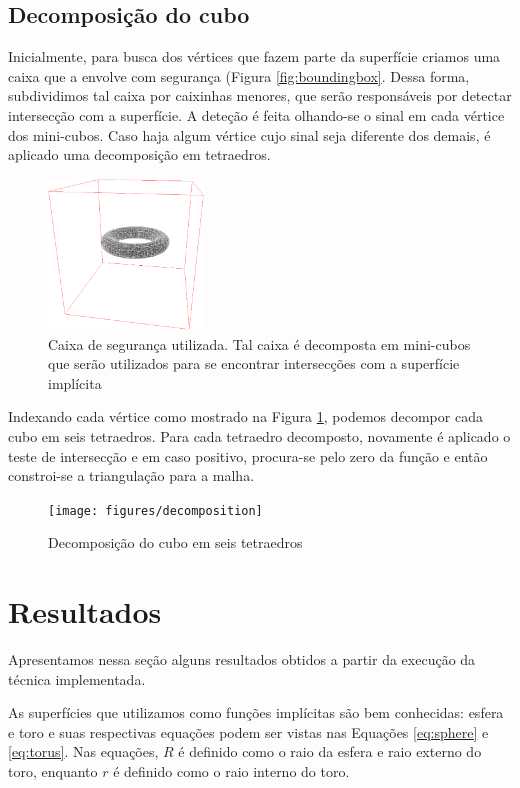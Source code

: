 \documentclass[11pt]{article}
\begin{document}
		\subsection{Decomposição do cubo} %
		\label{sub:decomposicao}
			Inicialmente, para busca dos vértices que fazem parte da superfície criamos uma caixa que a envolve com segurança (Figura \ref{fig:boundingbox}. Dessa forma, subdividimos tal caixa por caixinhas menores, que serão responsáveis por detectar intersecção com a superfície.
			A deteção é feita olhando-se o sinal em cada vértice dos mini-cubos. Caso haja algum vértice cujo sinal seja diferente dos demais, é aplicado uma decomposição em tetraedros. 

			\begin{figure}[h]
				\includegraphics[height=4cm]{figures/boundingbox}
				\caption{Caixa de segurança utilizada. Tal caixa é decomposta em mini-cubos que serão utilizados para se encontrar intersecções com a superfície implícita}
			\end{figure}

			Indexando cada vértice como mostrado na Figura \ref{fig:cubetotetra}, podemos decompor cada cubo em seis tetraedros. Para cada tetraedro decomposto, novamente é aplicado o teste de intersecção e em caso positivo, procura-se pelo zero da função e então constroi-se a triangulação para a malha.

			\begin{figure}[h]
				\texttt{[image: figures/decomposition]}
				\caption{Decomposição do cubo em seis tetraedros}
				\label{fig:cubetotetra}
			\end{figure}


	\section{Resultados} %
	\label{sec:resultados}
		Apresentamos nessa seção alguns resultados obtidos a partir da execução da técnica implementada.

		As superfícies que utilizamos como funções implícitas são bem conhecidas: esfera e toro e suas respectivas equações podem ser vistas nas Equações \ref{eq:sphere} e \ref{eq:torus}. Nas equações, $R$ é definido como o raio da esfera e raio externo do toro, enquanto $r$ é definido como o raio interno do toro.
\end{document}
